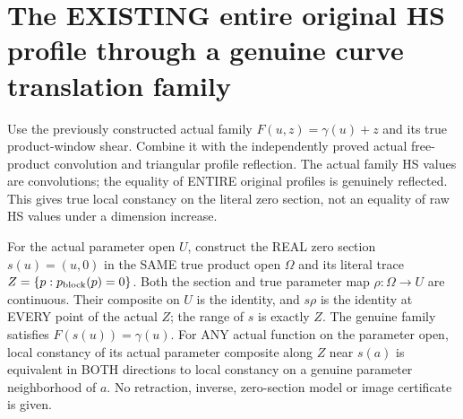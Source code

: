 \section{The EXISTING entire original HS profile through a genuine curve translation family}

Use the previously constructed actual family $F(u,z)=\gamma(u)+z$ and its
true product-window shear. Combine it with the independently proved actual
free-product convolution and triangular profile reflection. The actual
family HS values are convolutions; the equality of ENTIRE original profiles
is genuinely reflected. This gives true local constancy on the literal
zero section, not an equality of raw HS values under a dimension increase.

\begin{lemma}
\label{hir:actual-original-translation-zero-section-retraction}
\leanok
For the actual parameter open $U$, construct the REAL zero section
$s(u)=(u,0)$ in the SAME true product open $\Omega$ and its literal trace
$Z=\{p:p_{\rm block}(p)=0\}$. Both the section and true parameter map
$\rho:\Omega\to U$ are continuous. Their composite on $U$ is the identity,
and $s\rho$ is the identity at EVERY point of the actual $Z$; the range of
$s$ is exactly $Z$. The genuine family satisfies $F(s(u))=\gamma(u)$.
For ANY actual function on the parameter open, local constancy of its
actual parameter composite along $Z$ near $s(a)$ is equivalent in BOTH
directions to local constancy on a genuine parameter neighborhood of $a$.
No retraction, inverse, zero-section model or image certificate is given.
\end{lemma}
